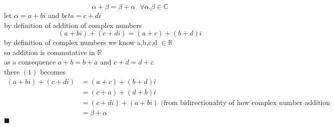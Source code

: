\documentclass{article}
\begin{document}
\begin{equation*}
    \alpha + \beta = \beta + \alpha \textrm{ }\forall \alpha \textrm{,}\beta \in \mathbb{C}
\end{equation*}
let $\alpha = a +bi$ and $beta = c + di$ \\
by definition of addition of complex numbers \\
\begin{equation}
(a + bi) + ( c + di) = (a+c) + ( b + d)i
\end{equation}
by definition of complex numbers we know a,b,c,d $\in \mathbb{R}$ \\
so addition is commutative in $\mathbb{R}$ \\
as a consequence $ a + b = b + a$ and $ c + d = d + c $ \\
there $(1)$ becomes
\begin{equation*}
\begin{split}
    (a + bi) + (c + di) &= (a + c) + (b + d)i \\
     &= (c + a) + (d + b)i \\
     &= (c + di) + (a +  bi)  \textrm{ (from bidirectionality of how complex number addition is defined) } \\
     &= \beta + \alpha 
\end{split}
\end{equation*}
$\blacksquare$
\end{document}
